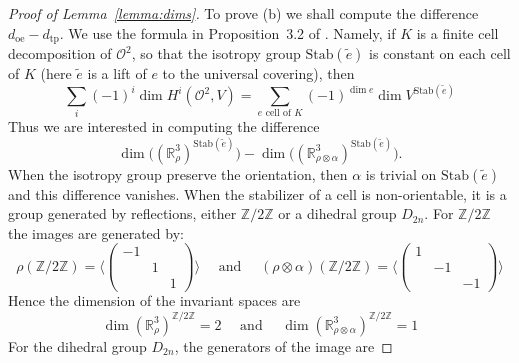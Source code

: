 \documentclass[a4paper,11pt]{article}
\begin{document}
\begin{proof}[Proof of Lemma~\ref{lemma:dims}]
To prove (b)  we 
shall compute the difference  $d_{\mathrm{oe}}-d_{\mathrm{tp}}$.
We use the formula in Proposition~3.2 of \cite{PortiDim}. Namely, if $K$ is a finite cell decomposition of $\mathcal O^2$,
so that the isotropy group $\mathrm{Stab}(\tilde e)$ is constant on each cell of $K$ 
(here $\tilde e$ is a lift of $e$ to the universal covering),
then
\begin{equation}
 \label{eqn:twistedEuler}
\sum_i (-1)^i\dim H^i(\mathcal O^2, V)= \sum_{e\textrm{ cell of }K} (-1)^{\dim e} \dim V^{\mathrm{Stab}(\tilde e) }
 \end{equation}
Thus we are interested in computing the difference 
\begin{equation*}
 \dim \big( ( \mathbb R^3_\rho   )^{\mathrm{Stab}(\tilde e)} \big)- \dim  \big( ( \mathbb R^3_{\rho\otimes\alpha } )  ^{\mathrm{Stab}(\tilde e)} \big).
\end{equation*}
 When the isotropy group preserve the orientation, then $\alpha$ is trivial on $\mathrm{Stab}(\tilde e)$ 
 and this difference  vanishes.
When the stabilizer of a cell is non-orientable, it is a group generated by reflections, either  $\mathbb{Z}/2\mathbb{Z}$ or a dihedral
group $D_{2n}$. 
For $\mathbb{Z}/2\mathbb{Z}$ the images are generated by:
$$
\rho( \mathbb{Z}/2\mathbb{Z} )= \langle  \left(\begin{smallmatrix} -1 & & \\ & 1 & \\ & & 1 \end{smallmatrix}\right)   \rangle 
\quad \textrm{ and }\quad
(\rho\otimes\alpha) ( \mathbb{Z}/2\mathbb{Z} )= \langle    \left(\begin{smallmatrix} 1 & & \\ & -1 & \\ & & -1 \end{smallmatrix}\right)
\rangle
$$
Hence the dimension of the invariant spaces are 
$$
 \dim(\mathbb R^3_{\rho})^{\mathbb{Z}/2\mathbb{Z}}= 2 
\quad \textrm{ and }\quad
 \dim(\mathbb R^3_{\rho\otimes\alpha})^{\mathbb{Z}/2\mathbb{Z}}= 1
$$
For the dihedral group $D_{2n}$, the generators of the image are

\end{proof}
\end{document}
